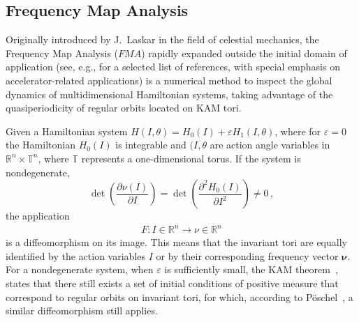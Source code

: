 \subsection{Frequency Map Analysis\label{subsec:dyn:fma}}
%
Originally introduced by J.~Laskar in the field of celestial mechanics, the Frequency Map Analysis ($FMA$) rapidly expanded outside the initial domain of application (see, e.g., \cite{laskar1995frequency,lega1996numerical,papaphilippou1996frequency,papaphilippou1998global,Laskar1999, Papaphilippou1999, laskar2000application,PhysRevSTAB.4.124201,1288929,Papaphilippou:PAC03-RPPG007,Laskar2003,PhysRevSTAB.6.114801,shun2009nonlinear,PhysRevSTAB.14.014001,papaphilippou2014,tydecks:ipac18-mopmf057,PhysRevAccelBeams.22.071002} for a selected list of references, with special emphasis on accelerator-related applications) is a numerical method to inspect the global dynamics of multidimensional Hamiltonian systems, taking advantage of the quasiperiodicity of regular orbits located on KAM tori.

Given a Hamiltonian system $H(I,\theta) = H_0 (I) + \varepsilon H_1 (I, \theta)$, where for $\varepsilon=0$ the Hamiltonian $H_0(I)$ is integrable and $(I, \theta$ are action angle variables in $\mathbb{R}^n \times \mathbb{T}^n$, where $\mathbb{T}$ represents a one-dimensional torus. %
If the system is nondegenerate,
\begin{equation}
    \operatorname{det}\left(\frac{\partial \nu(I)}{\partial I}\right)=\operatorname{det}\left(\frac{\partial^2 H_0(I)}{\partial I^2}\right) \neq 0 \,,
\end{equation}
the application
\begin{equation}
    \begin{array}{r}
    F: I\in \mathbb{R}^{n} \longrightarrow \nu\in \mathbb{R}^n 
    \end{array}
\end{equation}
is a diffeomorphism on its image. This means that the invariant tori are equally identified by the action variables $I$ or by their corresponding frequency vector $\mathbf{\nu}$. For a nondegenerate system, when $\varepsilon$ is sufficiently small, the KAM theorem~\cite{KAM1,KAM2,KAM3}, states that there still exists a set of initial conditions of positive measure that correspond to regular orbits on invariant tori, for which, according to Pöschel~\cite{Poschel1982}, a similar diffeomorphism still applies.

